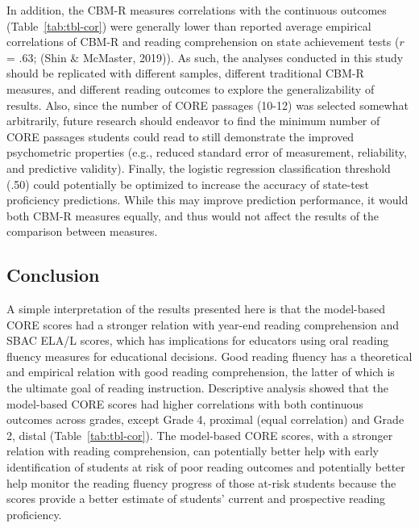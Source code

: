 \documentclass[
  english,
  man, fleqn, noextraspace]{apa6}
\begin{document}
In addition, the CBM-R measures correlations with the continuous outcomes (Table~\ref{tab:tbl-cor}) were generally lower than reported average empirical correlations of CBM-R and reading comprehension on state achievement tests (\(r\) = .63; (Shin \& McMaster, 2019)). As such, the analyses conducted in this study should be replicated with different samples, different traditional CBM-R measures, and different reading outcomes to explore the generalizability of results. Also, since the number of CORE passages (10-12) was selected somewhat arbitrarily, future research should endeavor to find the minimum number of CORE passages students could read to still demonstrate the improved psychometric properties (e.g., reduced standard error of measurement, reliability, and predictive validity). Finally, the logistic regression classification threshold (.50) could potentially be optimized to increase the accuracy of state-test proficiency predictions. While this may improve prediction performance, it would both CBM-R measures equally, and thus would not affect the results of the comparison between measures.

\hypertarget{conclusion}{%
\subsection{Conclusion}\label{conclusion}}

A simple interpretation of the results presented here is that the model-based CORE scores had a stronger relation with year-end reading comprehension and SBAC ELA/L scores, which has implications for educators using oral reading fluency measures for educational decisions. Good reading fluency has a theoretical and empirical relation with good reading comprehension, the latter of which is the ultimate goal of reading instruction. Descriptive analysis showed that the model-based CORE scores had higher correlations with both continuous outcomes across grades, except Grade 4, proximal (equal correlation) and Grade 2, distal (Table~\ref{tab:tbl-cor}). The model-based CORE scores, with a stronger relation with reading comprehension, can potentially better help with early identification of students at risk of poor reading outcomes and potentially better help monitor the reading fluency progress of those at-risk students because the scores provide a better estimate of students' current and prospective reading proficiency.
\end{document}
